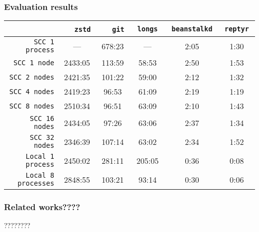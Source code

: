 \begin{frame}
\frametitle{Evaluation results}
\begin{table}[tbh]
\centering
\label{table:projects}
\begin{adjustbox}{width=110mm}
\begin{tabular}{|r|c|c|c|c|c|}
\hline
\           & $\quad$    \texttt{zstd}       $\quad$
            & $\quad$    \texttt{git}        $\quad$
            & $\quad$    \texttt{longs}      $\quad$
            & $\enspace$ \texttt{beanstalkd} $\enspace$
            & $\enspace$ \texttt{reptyr}     $\enspace$ \\ \hline

\texttt{SCC 1 process}
& ---     & 678:23   & ---    & 2:05 & 1:30 \\ \hline
\texttt{SCC 1 node}
& 2433:05 & 113:59   & 58:53  & 2:50 & 1:53 \\ \hline
\texttt{SCC 2 nodes}
& 2421:35 & 101:22   & 59:00  & 2:12 & 1:32 \\ \hline
\texttt{SCC 4 nodes}
& 2419:23 & 96:53    & 61:09  & 2:19 & 1:19 \\ \hline
\texttt{SCC 8 nodes}
& 2510:34 & 96:51    & 63:09  & 2:10 & 1:43 \\ \hline
\texttt{SCC 16 nodes}
& 2434:05 & 97:26    & 63:06  & 2:37 & 1:34 \\ \hline
\texttt{SCC 32 nodes}
& 2346:39 & 107:14   & 63:02  & 2:34 & 1:52 \\ \hline \hline
\texttt{Local 1 process}
& 2450:02 & 281:11   & 205:05 & 0:36 & 0:08 \\ \hline
\texttt{Local 8 processes}
& 2848:55 & 103:21   & 93:14  & 0:30 & 0:06 \\ \hline
\end{tabular}
\end{adjustbox}
\end{table}
\end{frame}


\begin{frame}
\frametitle{Related works????}
????????
\end{frame}

